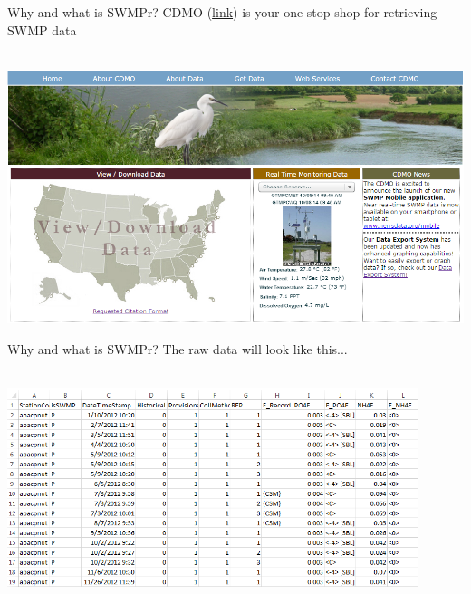 \documentclass[xcolor=dvipsnames]{beamer}\usepackage[]{graphicx}\usepackage[]{color}
\begin{document}
\begin{frame}[t]{Why and what is SWMPr?}
CDMO (\href{http://cdmo.baruch.sc.edu/}{link}) is your one-stop shop for retrieving SWMP data \\~\\
\centerline{\includegraphics[width = \textwidth]{imgs/cdmo_front.png}}
\end{frame}

\begin{frame}{Why and what is SWMPr?}
The raw data will look like this...\\~\\
\centerline{\includegraphics[width = 0.9\textwidth]{imgs/qaqc_ex.png}}
\end{frame}
\end{document}
